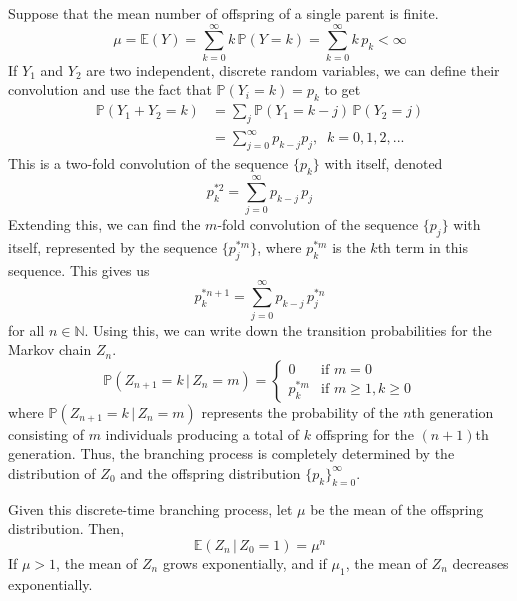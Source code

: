     Suppose that the mean number of offspring of a single parent is finite. 
    \begin{equation}
      \mu = \mathbb{E}(Y) = \sum_{k=0}^\infty k \, \mathbb{P}(Y = k) = \sum_{k=0}^\infty k \, p_k < \infty
    \end{equation}
    If $Y_1$ and $Y_2$ are two independent, discrete random variables, we can define their convolution and use the fact that $\mathbb{P}(Y_i = k) = p_k$ to get
    \begin{align*}
      \mathbb{P}(Y_1 + Y_2 = k) & = \sum_j \mathbb{P}(Y_1 = k - j) \, \mathbb{P}(Y_2 = j) \\
      & = \sum_{j=0}^\infty p_{k-j} p_j, \;\; k = 0, 1, 2, ...
    \end{align*}
    This is a two-fold convolution of the sequence $\{p_k\}$ with itself, denoted
    \begin{equation}
      p_k^{*2} = \sum_{j=0}^\infty p_{k-j} \, p_j
    \end{equation}
    Extending this, we can find the $m$-fold convolution of the sequence $\{p_j\}$ with itself, represented by the sequence $\{p_j^{*m}\}$, where $p_k^{*m}$ is the $k$th term in this sequence. This gives us
    \begin{equation}
      p_k^{*n+1} = \sum_{j=0}^\infty p_{k-j} \, p_j^{*n}
    \end{equation}
    for all $n \in \mathbb{N}$. Using this, we can write down the transition probabilities for the Markov chain $Z_n$. 
    \begin{equation}
      \mathbb{P}(Z_{n+1} = k \, | \, Z_n = m) = \begin{cases}
      0 & \text{if } m = 0 \\
      p_k^{*m} & \text{if } m \geq 1, k \geq 0
      \end{cases}
    \end{equation}
    where $\mathbb{P}(Z_{n+1} = k \, | \, Z_n = m)$ represents the probability of the $n$th generation consisting of $m$ individuals producing a total of $k$ offspring for the $(n+1)$th generation. Thus, the branching process is completely determined by the distribution of $Z_0$ and the offspring distribution $\{p_k\}_{k=0}^\infty$. 

    \begin{lemma}
      Given this discrete-time branching process, let $\mu$ be the mean of the offspring distribution. Then, 
      \begin{equation}
        \mathbb{E}(Z_n \, | \, Z_0 = 1) = \mu^n
      \end{equation}
      If $\mu > 1$, the mean of $Z_n$ grows exponentially, and if $\mu_1$, the mean of $Z_n$ decreases exponentially. 
    \end{lemma}

